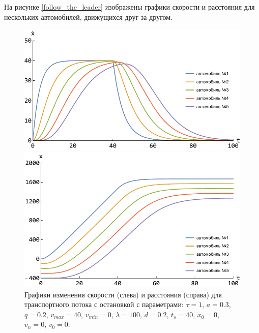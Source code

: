 \documentclass[12pt, a4paper]{extarticle}
\numberwithin{equation}{section}
\begin{document}
На рисунке \eqref{follow_the_leader} изображены графики скорости и расстояния для нескольких автомобилей, движущихся друг за другом.

\begin{figure}[h!]
	\begin{center}
		\begin{minipage}[h!]{0.48\linewidth}
			\includegraphics[width=1\linewidth,height=0.2\textheight]
			{Images/simple_model_speed.pdf}
		\end{minipage}
		\hfill 
		\begin{minipage}[h!]{0.48\linewidth}
			\includegraphics[width=1\linewidth,height=0.2\textheight]
			{Images/simple_model_distance.pdf}
		\end{minipage}
		\caption{Графики изменения скорости (слева) и расстояния (справа) для транспортного потока с остановкой с параметрами: $\tau=1$, $a=0.3$, $q=0.2$, $v_{max}=40$, $v_{min}=0$, $\lambda=100$, $d=0.2$, $t_s=40$, $x_0=0$, $v_n=0$, $v_0=0$.}
		\label{follow_the_leader}
	\end{center}
\end{figure}
\end{document}
